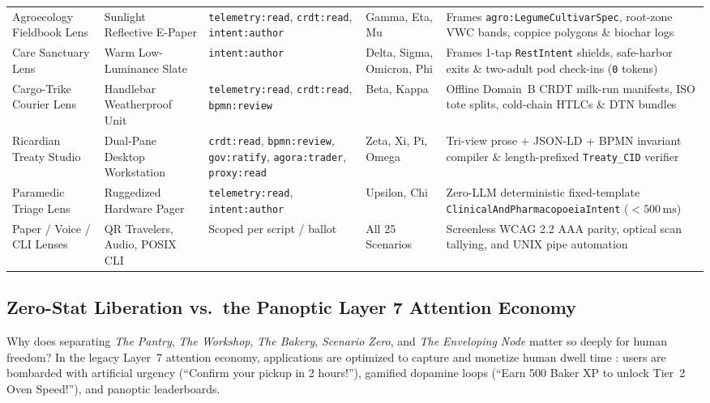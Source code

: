 \begin{table}[htbp]
{\begin{tabular}{@{}llllp{4.8cm}@{}}
Agroecology Fieldbook Lens & Sunlight Reflective E-Paper & \texttt{telemetry:read}, \texttt{crdt:read}, \texttt{intent:author} & Gamma, Eta, Mu & Frames \texttt{agro:LegumeCultivarSpec}, root-zone VWC bands, coppice polygons \& biochar logs \\
Care Sanctuary Lens & Warm Low-Luminance Slate & \texttt{intent:author} & Delta, Sigma, Omicron, Phi & Frames 1-tap \texttt{RestIntent} shields, safe-harbor exits \& two-adult pod check-ins (\texttt{0} tokens) \\
Cargo-Trike Courier Lens & Handlebar Weatherproof Unit & \texttt{telemetry:read}, \texttt{crdt:read}, \texttt{bpmn:review} & Beta, Kappa & Offline Domain~B CRDT milk-run manifests, ISO tote splits, cold-chain HTLCs \& DTN bundles \\
Ricardian Treaty Studio & Dual-Pane Desktop Workstation & \texttt{crdt:read}, \texttt{bpmn:review}, \texttt{gov:ratify}, \texttt{agora:trader}, \texttt{proxy:read} & Zeta, Xi, Pi, Omega & Tri-view prose + JSON-LD + BPMN invariant compiler \& length-prefixed \texttt{Treaty\_CID} verifier \\
Paramedic Triage Lens & Ruggedized Hardware Pager & \texttt{telemetry:read}, \texttt{intent:author} & Upsilon, Chi & Zero-LLM deterministic fixed-template \texttt{ClinicalAndPharmacopoeiaIntent} ($<500\,\mathrm{ms}$) \\
Paper / Voice / CLI Lenses & QR Travelers, Audio, POSIX CLI & Scoped per script / ballot & All 25 Scenarios & Screenless WCAG 2.2 AAA parity, optical scan tallying, and UNIX pipe automation \\
\bottomrule
\end{tabular}%
}
\end{table}

\subsection{Zero-Stat Liberation vs.\ the Panoptic Layer 7 Attention Economy}
\label{subsec:ch1-zero-stat-liberation}

Why does separating \textit{The Pantry}, \textit{The Workshop}, \textit{The Bakery}, \textit{Scenario
Zero}, and \textit{The Enveloping Node} matter so deeply for human freedom? In the legacy Layer~7
attention economy, applications are optimized to capture and monetize human dwell time
\parencite{zuboff2019,gray2018darkpatterns}: users are bombarded with artificial urgency (``Confirm
your pickup in 2 hours!''), gamified dopamine loops (``Earn 500 Baker XP to unlock Tier~2 Oven
Speed!''), and panoptic leaderboards.

